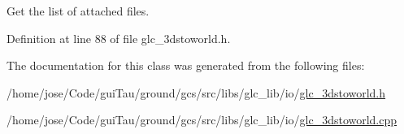 Get the list of attached files. 



Definition at line 88 of file glc\-\_\-3dstoworld.\-h.



The documentation for this class was generated from the following files\-:\begin{DoxyCompactItemize}
\item 
/home/jose/\-Code/gui\-Tau/ground/gcs/src/libs/glc\-\_\-lib/io/\hyperlink{glc__3dstoworld_8h}{glc\-\_\-3dstoworld.\-h}\item 
/home/jose/\-Code/gui\-Tau/ground/gcs/src/libs/glc\-\_\-lib/io/\hyperlink{glc__3dstoworld_8cpp}{glc\-\_\-3dstoworld.\-cpp}\end{DoxyCompactItemize}
